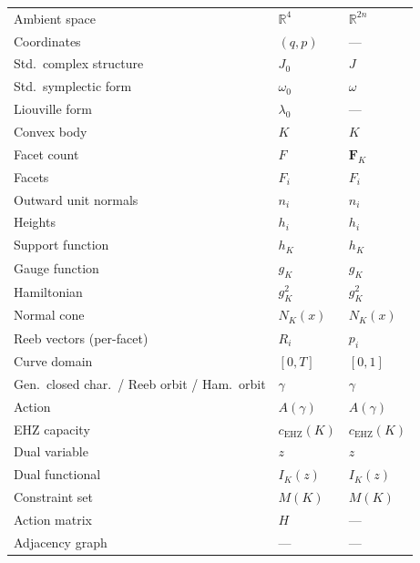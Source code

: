 \begin{longtable}{p{5.5cm} p{3.5cm} p{3.5cm}}
Ambient space                                    & $\mathbb{R}^4$      & $\mathbb{R}^{2n}$ \\
Coordinates                                      & $(q,p)$              & --- \\
Std.\ complex structure                          & $J_0$                & $J$ \\
Std.\ symplectic form                            & $\omega_0$           & $\omega$ \\
Liouville form                                   & $\lambda_0$          & --- \\
Convex body                                      & $K$                  & $K$ \\
Facet count                                      & $F$                  & $\mathbf{F}_K$ \\
Facets                                           & $F_i$                & $F_i$ \\
Outward unit normals                             & $n_i$                & $n_i$ \\
Heights                                          & $h_i$                & $h_i$ \\
Support function                                 & $h_K$                & $h_K$ \\
Gauge function                                   & $g_K$                & $g_K$ \\
Hamiltonian                                      & $g_K^2$              & $g_K^2$ \\
Normal cone                                      & $N_K(x)$             & $N_K(x)$ \\
Reeb vectors (per-facet)                         & $R_i$                & $p_i$ \\
Curve domain                                     & $[0,T]$              & $[0,1]$ \\
Gen.\ closed char.\ / Reeb orbit / Ham.\ orbit  & $\gamma$             & $\gamma$ \\
Action                                           & $A(\gamma)$          & $A(\gamma)$ \\
EHZ capacity                                     & $c_\mathrm{EHZ}(K)$ & $c_\mathrm{EHZ}(K)$ \\
Dual variable                                    & $z$                  & $z$ \\
Dual functional                                  & $I_K(z)$             & $I_K(z)$ \\
Constraint set                                   & $M(K)$               & $M(K)$ \\
Action matrix                                    & $H$                  & --- \\
Adjacency graph                                  & ---                  & --- \\

\bottomrule
\end{longtable}

